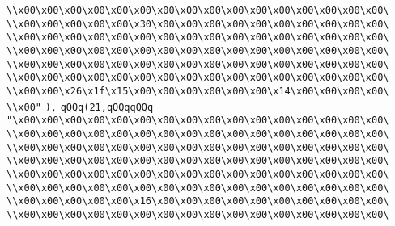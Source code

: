 \verb|\\x00\x00\x00\x00\x00\x00\x00\x00\x00\x00\x00\x00\x00\x00\x00\x00\|\newline
\verb|\\x00\x00\x00\x00\x00\x30\x00\x00\x00\x00\x00\x00\x00\x00\x00\x00\|\newline
\verb|\\x00\x00\x00\x00\x00\x00\x00\x00\x00\x00\x00\x00\x00\x00\x00\x00\|\newline
\verb|\\x00\x00\x00\x00\x00\x00\x00\x00\x00\x00\x00\x00\x00\x00\x00\x00\|\newline
\verb|\\x00\x00\x00\x00\x00\x00\x00\x00\x00\x00\x00\x00\x00\x00\x00\x00\|\newline
\verb|\\x00\x00\x00\x00\x00\x00\x00\x00\x00\x00\x00\x00\x00\x00\x00\x00\|\newline
\verb|\\x00\x00\x26\x1f\x15\x00\x00\x00\x00\x00\x00\x14\x00\x00\x00\x00\|\newline
\verb|\\x00"|\newline
\verb|),|\newline
\verb|qQQq(21,qQQqqQQq|\newline
\verb|"\x00\x00\x00\x00\x00\x00\x00\x00\x00\x00\x00\x00\x00\x00\x00\x00\|\newline
\verb|\\x00\x00\x00\x00\x00\x00\x00\x00\x00\x00\x00\x00\x00\x00\x00\x00\|\newline
\verb|\\x00\x00\x00\x00\x00\x00\x00\x00\x00\x00\x00\x00\x00\x00\x00\x00\|\newline
\verb|\\x00\x00\x00\x00\x00\x00\x00\x00\x00\x00\x00\x00\x00\x00\x00\x00\|\newline
\verb|\\x00\x00\x00\x00\x00\x00\x00\x00\x00\x00\x00\x00\x00\x00\x00\x00\|\newline
\verb|\\x00\x00\x00\x00\x00\x00\x00\x00\x00\x00\x00\x00\x00\x00\x00\x00\|\newline
\verb|\\x00\x00\x00\x00\x00\x16\x00\x00\x00\x00\x00\x00\x00\x00\x00\x00\|\newline
\verb|\\x00\x00\x00\x00\x00\x00\x00\x00\x00\x00\x00\x00\x00\x00\x00\x00\|\newline
